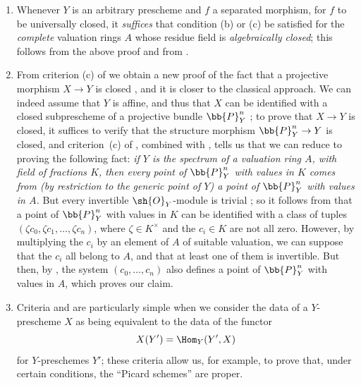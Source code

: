 \begin{remarks}[7.3.9]
\label{II.7.3.9}
\begin{enumerate}
    \item[\rm{(i)}] Whenever $Y$ is an arbitrary prescheme and $f$ a separated morphism, for $f$ to be universally closed, it \emph{suffices} that condition (b) or (c) be satisfied for the \emph{complete} valuation rings $A$ whose residue field is \emph{algebraically closed};
        this follows from the above proof and from .
    \item[\rm{(ii)}] From criterion (c) of  we obtain a new proof of the fact that a projective morphism $X\to Y$ is closed , and it is closer to the classical approach.
        We can indeed assume that $Y$ is affine, and thus that $X$ can be identified with a closed subprescheme of a projective bundle $\bb{P}_Y^n$ ;
        to prove that $X\to Y$ is closed, it suffices to verify that the structure morphism $\bb{P}_Y^n\to Y$ is closed, and criterion~(c) of , combined with , tells us that we can reduce to proving the following fact:
        \emph{if $Y$ is the spectrum of a valuation ring $A$, with field of fractions $K$, then every point of $\bb{P}_Y^n$ with values in $K$ comes from (by restriction to the generic point of $Y$) a point of $\bb{P}_Y^n$ with values in $A$.}
        But every invertible $\sh{O}_Y$-module is trivial ;
        so it follows from  that a point of $\bb{P}_Y^n$ with values in $K$ can be identified with a class of tuples $(\zeta c_0,\zeta c_1,\ldots,\zeta c_n)$, where $\zeta\in K^\times$ and the $c_i\in K$ are not all zero.
        However, by multiplying the $c_i$ by an element of $A$ of
        suitable valuation, we can suppose that the $c_i$ all belong to $A$, and that at least one of them is invertible.
        But then, by , the system $(c_0,\ldots,c_n)$ also defines a point of $\bb{P}_Y^n$ with values in $A$, which proves our claim.
    \item[\rm{(iii)}] Criteria  and  are particularly simple when we consider the data of a $Y$-prescheme $X$ as being equivalent to the data of the functor
        \[
            X(Y') = \Hom_Y(Y',X)
        \]
        for $Y$-preschemes $Y'$;
        these criteria allow us, for example, to prove that, under certain conditions, the ``Picard schemes'' are proper.
\end{enumerate}
\end{remarks}

